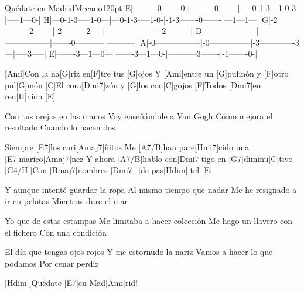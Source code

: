 \begin{song}{Quédate en Madrid}{Mecano}{120pt}
\tabs{20pt}
E|---------0-------0-|---------0-------|-----0-1-3---1-0-3-|-----1---0-|
H|---0-1-3-----1-0---|---0-1-3-----1-0-|-1-3-------0-------|---1---1---|
G|-2---------2-------|-2---------2-----|-------------------|-2---------|
D|-------------------|-----------------|-------0-----------|-----------|
A|-0-----------------|-0---------------|-3-------------3---|-----3-----|
E|-------3---1---0---|-------3---1---0-|-----------3-------|-1-------0-|
\endtabs

%
[Ami]Con la na[G]riz en[F]tre tus [G]ojos
Y [Ami]entre un [G]pulmón y [F]otro pul[G]món
[C]El cora[Dmi7]zón y [G]los con[C]gojos
[F]Todos [Dmi7]en reu[H]nión [E]{}

%
Con tus orejas en las manos
Voy enseñándole a Van Gogh
Cómo mejora el resultado
Cuando lo hacen dos

\chorus%
[Hmi7]Siempre [E7]los cari[Amaj7]{}ñitos
Me [A7/B]han pare[Hmi7]cido una [E7]marico[Amaj7]nez
Y ahora [A7/B]hablo con[Dmi7]tigo en [G7]diminu[C]tivo
[G4/H|]{}Con [Bmaj7]nombres [Dmi7_]{de pas}[Hdim|]{tel} [E]{}

%
Y aunque intenté guardar la ropa
Al mismo tiempo que nadar
Me he resignado a ir en pelotas
Mientras dure el mar

\pagebreak
\chorus%
Yo que de estas estampas
Me limitaba a hacer colección
Me hago un llavero con el fichero
Con una condición

%
El día que tengas ojos rojos
Y me estornude la nariz
Vamos a hacer lo que podamos
Por cenar perdiz

[Hdim]{}¡Quédate [E7]en Mad[Ami]rid!
\end{song}
